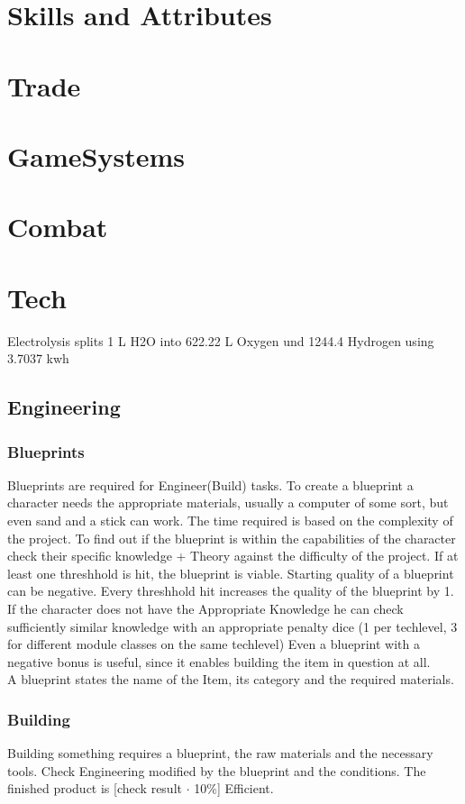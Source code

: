 \chapter{Skills and Attributes}\label{ch:skillsandattributes}


\chapter{Trade}\label{ch:trade}



\chapter{GameSystems}\label{ch:gamesystems}



\chapter{Combat}\label{ch:combat}


\chapter{Tech}\label{ch:tech}
Electrolysis splits 1 L H2O into 622.22 L Oxygen und 1244.4 Hydrogen using 3.7037 kwh\\
\section{Engineering}\label{sec:engineering}
\subsection{Blueprints}\label{subsec:blueprints}
Blueprints are required for Engineer(Build) tasks.
To create a blueprint a character needs the appropriate materials, usually a computer of some sort, but even sand and a
stick can work.
The time required is based on the complexity of the project.
To find out if the blueprint is within the capabilities of the character check their specific knowledge + Theory
against the difficulty of the project.
If at least one threshhold is hit, the blueprint is viable.
Starting quality of a blueprint can be negative.
Every threshhold hit increases the quality of the blueprint by 1.
If the character does not have the Appropriate Knowledge he can check sufficiently similar knowledge with
an appropriate penalty dice (1 per techlevel, 3 for different module classes on the same techlevel)
Even a blueprint with a negative bonus is useful, since it enables building the item in question at all.\\
A blueprint states the name of the Item, its category and the required materials.

\subsection{Building}\label{subsec:building}
Building something requires a blueprint, the raw materials and the necessary tools.
Check Engineering modified by the blueprint and the conditions.
The finished product is [check result \(\cdot\) 10\%] Efficient.
